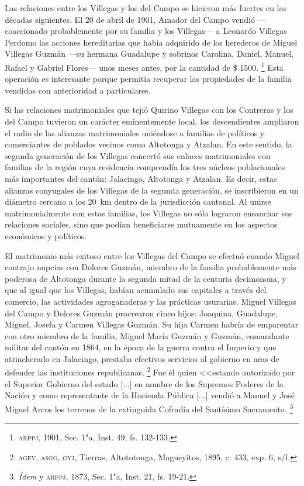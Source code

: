 \documentclass[14pt,twoside,final]{extbook} %
\let\oldfootnote\footnote
\renewcommand\footnote[1]{%
\oldfootnote{\hspace{1mm}#1}}
\begin{document}
Las relaciones entre los Villegas y los del Campo se hicieron más fuertes en las décadas siguientes. El 20 de abril de 1901, Amador del Campo vendió ---coaccionado probablemente por su familia y los Villegas--- a Leonardo Villegas Perdomo las acciones hereditarias que había adquirido de los herederos de Miguel Villegas Guzmán ---su hermana Guadalupe y sobrinos Carolina, Daniel, Manuel, Rafael y Gabriel Flores--- unos meses antes, por la cantidad de \$ 1500.\footnote{\textsc{arppj}, 1901, Sec. 1"a, Inst. 49, fs. 132-133.} Esta operación es interesante porque permitía recuperar las propiedades de la familia vendidas con anterioridad a particulares.

Si las relaciones matrimoniales que tejió Quirino Villegas con los Contreras y los del Campo tuvieron un carácter eminentemente local, los descendientes ampliaron el radio de las alianzas matrimoniales uniéndose a familias de políticos y comerciantes de poblados vecinos como Altotonga y Atzalan. En este sentido, la segunda generación de los Villegas concertó sus enlaces matrimoniales con familias de la región cuya residencia comprendía los tres núcleos poblacionales más importantes del cantón: Jalacingo, Altotonga y Atzalan. Es decir, estas alianzas conyugales de los Villegas de la segunda generación, se inscribieron en un diámetro cercano a los 20~km dentro de la jurisdicción cantonal. Al unirse matrimonialmente con estas familias, los Villegas no sólo lograron ensanchar sus relaciones sociales, sino que podían beneficiarse mutuamente en los aspectos económicos y políticos.

El matrimonio más exitoso entre los Villegas del Campo se efectuó cuando Miguel contrajo nupcias con Dolores Guzmán, miembro de la familia probablemente más poderosa de Altotonga durante la segunda mitad de la centuria decimonona, y que al igual que los Villegas, habían acumulado sus capitales a través del comercio, las actividades agroganaderas y las prácticas usurarias. Miguel Villegas del Campo y Dolores Guzmán procrearon cinco hijos: Joaquina, Guadalupe, Miguel, Josefa y Carmen Villegas Guzmán. Su hija Carmen habría de emparentar con otro miembro de la familia, Miguel María Guzmán y Guzmán, comandante militar del cantón en 1864, en la época de la guerra contra el Imperio y que atrincherado en Jalacingo, prestaba efectivos servicios al gobierno en aras de defender las instituciones republicanas.\footnote{\textsc{agev, asgg, gyj}, Tierras, Altototonga, Magueyitos, 1895, c. 433, exp. 6, s/f.} Fue él quien <<estando autorizado por el Superior Gobierno del estado [...] en nombre de los Supremos Poderes de la Nación y como representante de la Hacienda Pública [...] vendió a Manuel y José Miguel Arcos los terrenos de la extinguida Cofradía del Santísimo Sacramento.\footnote{\emph{Ídem} y \textsc{arppj}, 1873, Sec. 1"a, Inst. 21, fs. 19-21.}
\end{document}
